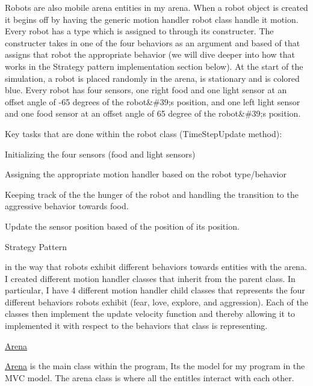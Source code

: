 Robots are also mobile arena entities in my arena. When a robot object is created it begins off by having the generic motion handler robot class handle it motion. Every robot has a type which is assigned to through its constructer. The constructer takes in one of the four behaviors as an argument and based of that assigns that robot the appropriate behavior (we will dive deeper into how that works in the Strategy pattern implementation section below). At the start of the simulation, a robot is placed randomly in the arena, is stationary and is colored blue. Every robot has four sensors, one right food and one light sensor at an offset angle of -\/65 degrees of the robot\&\#39;s position, and one left light sensor and one food sensor at an offset angle of 65 degree of the robot\&\#39;s position.

Key tasks that are done within the robot class (Time\+Step\+Update method)\+:


\begin{DoxyItemize}
\item Initializing the four sensors (food and light sensors)
\item Assigning the appropriate motion handler based on the robot type/behavior
\item Keeping track of the the hunger of the robot and handling the transition to the aggressive behavior towards food.
\item Update the sensor position based of the position of its position.
\item Strategy Pattern
\begin{DoxyItemize}
\item in the way that robots exhibit different behaviors towards entities with the arena. I created different motion handler classes that inherit from the parent class. In particular, I have 4 different motion handler child classes that represents the four different behaviors robots exhibit (fear, love, explore, and aggression). Each of the classes then implement the update velocity function and thereby allowing it to implemented it with respect to the behaviors that class is representing.
\end{DoxyItemize}
\end{DoxyItemize}

\mbox{\hyperlink{class_arena}{Arena}}

\mbox{\hyperlink{class_arena}{Arena}} is the main class within the program, Its the model for my program in the M\+VC model. The arena class is where all the entitles interact with each other.

